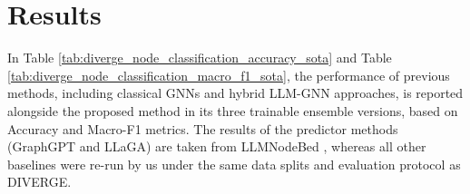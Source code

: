 \documentclass[a4paper,fleqn]{cas-sc}
\DeclareRobustCommand{\revcommon}[2][]{\textcolor{revshared}{#2}} %
\begin{document}
\section{Results}\label{sec:Results}

In Table \ref{tab:diverge_node_classification_accuracy_sota} and Table \ref{tab:diverge_node_classification_macro_f1_sota}, the performance of previous methods, including classical GNNs and hybrid LLM-GNN approaches, is reported alongside the proposed method in its three trainable ensemble versions, based on Accuracy and Macro-F1 metrics. \revcommon[R1,R2,R4]{The results of the predictor methods (GraphGPT and LLaGA) are taken from LLMNodeBed \citep{Wu2025LLMNode}, whereas all other baselines were re-run by us under the same data splits and evaluation protocol as DIVERGE.}
\end{document}
